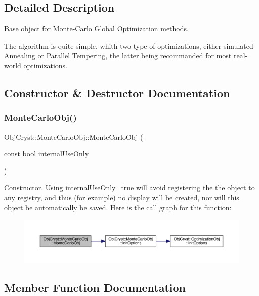 \subsection{Detailed Description}
Base object for Monte-\/\+Carlo Global Optimization methods. 

The algorithm is quite simple, whith two type of optimizations, either simulated Annealing or Parallel Tempering, the latter being recommanded for most real-\/world optimizations. 

\subsection{Constructor \& Destructor Documentation}
\mbox{\label{class_obj_cryst_1_1_monte_carlo_obj_a503419b4b79fdb5ae41928656a888ec8}} 
\subsubsection{\texorpdfstring{MonteCarloObj()}{MonteCarloObj()}}
{\footnotesize\ttfamily Obj\+Cryst\+::\+Monte\+Carlo\+Obj\+::\+Monte\+Carlo\+Obj (\begin{DoxyParamCaption}\item[{const bool}]{internal\+Use\+Only }\end{DoxyParamCaption})}

Constructor. Using internal\+Use\+Only=true will avoid registering the the object to any registry, and thus (for example) no display will be created, nor will this object be automatically be saved. Here is the call graph for this function\+:
\nopagebreak
\begin{figure}[H]
\begin{center}
\leavevmode
\includegraphics[width=350pt]{class_obj_cryst_1_1_monte_carlo_obj_a503419b4b79fdb5ae41928656a888ec8_cgraph}
\end{center}
\end{figure}


\subsection{Member Function Documentation}
\mbox{\label{class_obj_cryst_1_1_monte_carlo_obj_acd2853f973a5b26b5fac47e3152aec4b}} 
